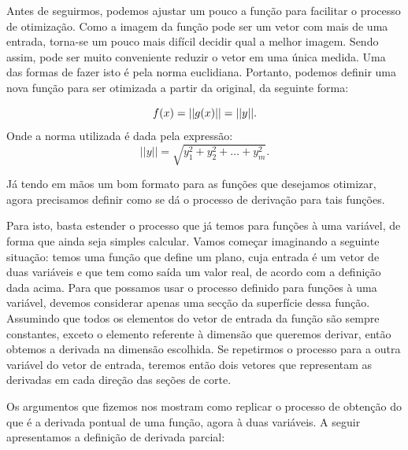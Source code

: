 Antes de seguirmos, podemos ajustar um pouco a função para facilitar o
processo de otimização. Como a imagem da função pode ser um vetor com
mais de uma entrada, torna-se um pouco mais difícil decidir qual a melhor
imagem. Sendo assim, pode ser muito conveniente reduzir o vetor em uma
única medida. Uma das formas de fazer isto é pela norma euclidiana.
Portanto, podemos definir uma nova função para ser otimizada a partir da
original, da seguinte forma:


\begin{equation}
        f(x) = ||g(x)|| = ||y||.\\
\end{equation}
        Onde a norma utilizada é dada pela expressão:
\begin{equation}
        ||y|| = \sqrt{ y_1^2 + y_2^2 + \hdots + y_m^2}.
\end{equation}

Já tendo em mãos um bom formato para as funções que desejamos otimizar, agora
precisamos definir como se dá o processo de derivação para tais funções.

Para isto, basta estender o processo que já temos para funções à uma variável,
de forma que ainda seja simples calcular. Vamos começar imaginando a seguinte
situação: temos uma função que define um plano, cuja entrada é um vetor de
duas variáveis e que tem como saída um valor real, de acordo com a definição
dada acima. Para que possamos usar o processo definido para funções à uma
variável, devemos considerar apenas uma secção da superfície dessa função.
Assumindo que todos os elementos do vetor de entrada da função são sempre
constantes, exceto o elemento referente à dimensão que queremos derivar,
então obtemos a derivada na dimensão escolhida. Se repetirmos o processo para
a outra variável do vetor de entrada, teremos então dois vetores que
representam as derivadas em cada direção das seções de corte.

Os argumentos que fizemos nos mostram como replicar o processo de obtenção do
que é a derivada pontual de uma função, agora à duas variáveis. A seguir
apresentamos a definição de derivada parcial:

